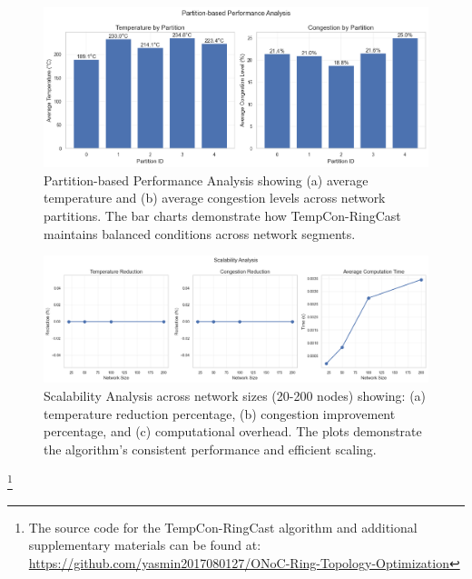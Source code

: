 \documentclass[conference]{IEEEtran}
\begin{document}
\begin{figure}[h]
    \centering
    \includegraphics[width=\linewidth]{partition_analysis.png}
    \caption{Partition-based Performance Analysis showing (a) average temperature and (b) average congestion levels across network partitions. The bar charts demonstrate how TempCon-RingCast maintains balanced conditions across network segments.}
    \label{fig:partition_analysis}
\end{figure}

\begin{figure}[h]
    \centering
    \includegraphics[width=\linewidth]{scalability.png}
    \caption{Scalability Analysis across network sizes (20-200 nodes) showing: (a) temperature reduction percentage, (b) congestion improvement percentage, and (c) computational overhead. The plots demonstrate the algorithm's consistent performance and efficient scaling.}
    \label{fig:scalability}
\end{figure}

\footnote{The source code for the TempCon-RingCast algorithm and additional supplementary materials can be found at: \href{https://github.com/yasmin2017080127/ONoC-Ring-Topology-Optimization}{https://github.com/yasmin2017080127/ONoC-Ring-Topology-Optimization}}

\nocite{*}



\end{document}
